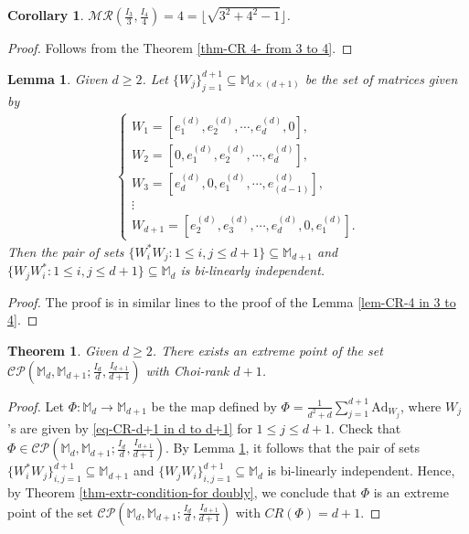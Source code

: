\documentclass[10pt,reqno]{amsart}
\theoremstyle{definition}
\theoremstyle{plain}
\newtheorem{thm}[defn]{Theorem}
\newtheorem{lem}[defn]{Lemma}
\newtheorem{cor}[defn]{Corollary}
\theoremstyle{remark}
\newcommand{\mbb}[1]{\mathbb{#1}}
\newcommand{\msc}[1]{\mathscr{#1}}
\newcommand{\M}[1]{\mbb{M}_{#1}}%
\numberwithin{equation}{section}%
\begin{document}
\begin{cor}
	$\msc{MR}(\frac{I_{3}}{3},\frac{I_{4}}{4})=4=\lfloor{\sqrt{3^2+4^2-1}}\rfloor$.
\end{cor}


\begin{proof}
	Follows from the Theorem \ref{thm-CR 4- from 3 to 4}.
\end{proof}


\begin{lem}\label{lem-CR-d+1 in d to d+1}
	Given $d\geq 2$. Let $\{W_j\}_{j=1}^{d+1}\subseteq\M{d\times (d+1)}$ be the set of matrices given by
	\begin{align}\label{eq-CR-d+1 in d to d+1}
			\begin{cases}
				W_1=[e_1^{(d)},e_2^{(d)},\cdots,e_d^{(d)},0],\\
				W_2=[0,e_1^{(d)},e_2^{(d)},\cdots,e_d^{(d)}],\\
				W_3=[e_d^{(d)},0,e_1^{(d)},\cdots,e_{(d-1)}^{(d)}],\\
				\vdots\\
				W_{d+1}=[e_2^{(d)},e_3^{(d)},\cdots,e_d^{(d)},0,e_1^{(d)}].
			\end{cases}
	\end{align}
	Then the pair of sets $\{W_i^*W_j:1\leq i,j\leq d+1\}\subseteq\M{d+1}$ and $\{W_jW_i^*:1\leq i,j\leq d+1\}\subseteq\M{d}$ is bi-linearly independent.
\end{lem}



\begin{proof}
	The proof is in similar lines to the proof of the Lemma \ref{lem-CR-4 in 3 to 4}.
\end{proof}



\begin{thm}\label{thm-CR d+1-d to d+1}
	Given $d\geq 2$. There exists an extreme point of the set $\msc{CP}(\M{d},\M{d+1}; \frac{I_{d}}{d},\frac{I_{d+1}}{d+1})$ with Choi-rank $d+1$.
\end{thm}


\begin{proof}
	Let $\Phi:\M{d}\to\M{d+1}$ be the map defined by $	\Phi=\frac{1}{d^2+d}\sum_{j=1}^{d+1}\mathrm{Ad}_{W_j}$, where $W_j$'s are given by \eqref{eq-CR-d+1 in d to d+1} for $1\leq j\leq d+1$. Check that $\Phi\in\msc{CP}(\M{d},\M{d+1}; \frac{I_{d}}{d},\frac{I_{d+1}}{d+1})$. By Lemma \ref{lem-CR-d+1 in d to d+1}, it follows that the pair of sets $\{W_i^*W_j\}_{i,j=1}^{d+1}\subseteq\M{d+1}$ and $\{W_jW_i\}_{i,j=1}^{d+1}\subseteq\M{d}$ is bi-linearly independent. Hence, by Theorem \ref{thm-extr-condition-for doubly}, we conclude that $\Phi$ is an extreme point of the set $\msc{CP}(\M{d},\M{d+1}; \frac{I_{d}}{d},\frac{I_{d+1}}{d+1})$ with  $CR(\Phi)=d+1$.
\end{proof}
\end{document}
